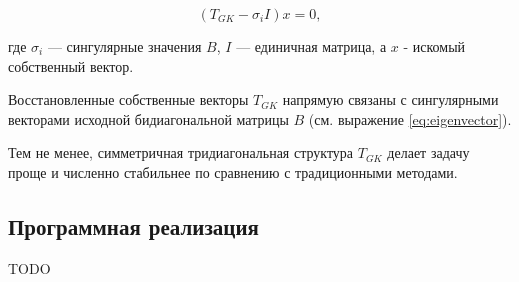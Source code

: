 \begin{equation}
( T_{GK} - \sigma_i I )x = 0,
\end{equation}

где \( \sigma_i \) — сингулярные значения \( B \), \( I \) — единичная матрица, а \(x\) - искомый собственный вектор.

Восстановленные собственные векторы \( T_{GK} \) напрямую связаны с сингулярными векторами исходной бидиагональной матрицы \( B \) (см. выражение \eqref{eq:eigenvector}).

Тем не менее, симметричная тридиагональная структура \( T_{GK} \) делает задачу проще и численно стабильнее по сравнению с традиционными методами.



\subsection{Программная реализация}

TODO





